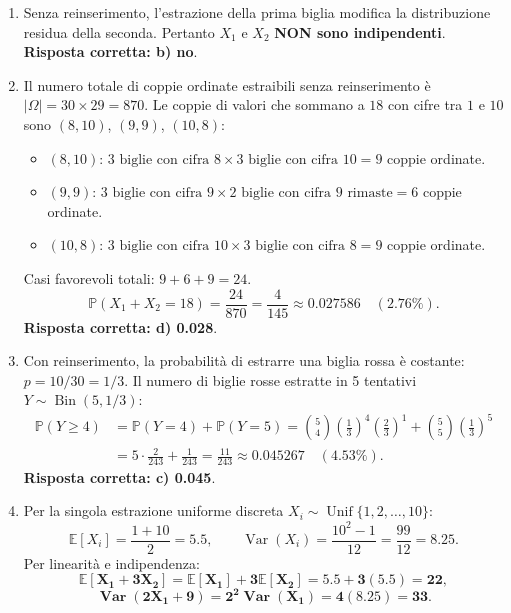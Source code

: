 \documentclass[11pt,a4paper]{article}
\newcommand{\EE}{\mathbb{E}}
\newcommand{\Prob}{\mathbb{P}}
\newcommand{\Var}{\operatorname{Var}}
\begin{document}
\begin{soluzionebox}
\begin{enumerate}[label=(\alph*)]
    \item Senza reinserimento, l'estrazione della prima biglia modifica la distribuzione residua della seconda. Pertanto $X_1$ e $X_2$ \textbf{NON sono indipendenti}.\\
    \textbf{Risposta corretta: b) no}.

    \item Il numero totale di coppie ordinate estraibili senza reinserimento è $|\Omega| = 30 \times 29 = 870$.
    Le coppie di valori che sommano a $18$ con cifre tra $1$ e $10$ sono $(8, 10)$, $(9, 9)$, $(10, 8)$:
    \begin{itemize}
        \item $(8, 10)$: $3 \text{ biglie con cifra 8} \times 3 \text{ biglie con cifra 10} = 9$ coppie ordinate.
        \item $(9, 9)$: $3 \text{ biglie con cifra 9} \times 2 \text{ biglie con cifra 9 rimaste} = 6$ coppie ordinate.
        \item $(10, 8)$: $3 \text{ biglie con cifra 10} \times 3 \text{ biglie con cifra 8} = 9$ coppie ordinate.
    \end{itemize}
    Casi favorevoli totali: $9 + 6 + 9 = 24$.
    \[
    \Prob(X_1 + X_2 = 18) = \frac{24}{870} = \frac{4}{145} \approx \mathbf{0.027586} \quad (\mathbf{2.76\%}).
    \]
    \textbf{Risposta corretta: d) 0.028}.

    \item Con reinserimento, la probabilità di estrarre una biglia rossa è costante: $p = 10/30 = 1/3$.
    Il numero di biglie rosse estratte in 5 tentativi $Y \sim \operatorname{Bin}(5, 1/3)$:
    \begin{align*}
    \Prob(Y \ge 4) &= \Prob(Y = 4) + \Prob(Y = 5) = \binom{5}{4}\left(\frac{1}{3}\right)^4\left(\frac{2}{3}\right)^1 + \binom{5}{5}\left(\frac{1}{3}\right)^5 \\
    &= 5 \cdot \frac{2}{243} + \frac{1}{243} = \frac{11}{243} \approx \mathbf{0.045267} \quad (\mathbf{4.53\%}).
    \end{align*}
    \textbf{Risposta corretta: c) 0.045}.

    \item Per la singola estrazione uniforme discreta $X_i \sim \operatorname{Unif}\{1, 2, \dots, 10\}$:
    \[
    \EE[X_i] = \frac{1 + 10}{2} = 5.5, \qquad \Var(X_i) = \frac{10^2 - 1}{12} = \frac{99}{12} = 8.25.
    \]
    Per linearità e indipendenza:
    \[
    \mathbf{\EE[X_1 + 3X_2] = \EE[X_1] + 3\EE[X_2] = 5.5 + 3(5.5) = 22},
    \]
    \[
    \mathbf{\Var(2X_1 + 9) = 2^2 \Var(X_1) = 4(8.25) = 33}.
    \]


\end{enumerate}
\end{soluzionebox}
\end{document}

